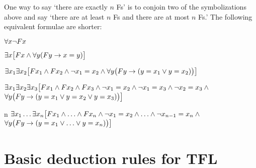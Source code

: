One way to say `there are exactly $n$ Fs' is to conjoin two of the symbolizations above and say `there are at least $n$ Fs and there are at most $n$ Fs.' The following equivalent formulae are shorter:
\begin{ekey}
\item[\text{zero}] $\forall x\neg Fx$
\item[\text{one}] $\exists x\bigl[Fx \wedge \forall y(Fy \rightarrow x= y)\bigr]$
\item[\text{two}] $\exists x_1\exists x_2\bigl[Fx_1 \wedge Fx_2 \wedge \neg x_1 = x_2 \wedge \forall y\bigl(Fy \rightarrow (y= x_1 \vee y = x_2)\bigr) \bigr]$
\item[\text{three}] $\exists x_1\exists x_2\exists x_3\bigl[Fx_1 \wedge Fx_2 \wedge Fx_3 \wedge \neg x_1 =  x_2 \wedge \neg  x_1 = x_3 \wedge \neg x_2 = x_3 \wedge \phantom{.}$\\
\phantom{$\exists x_1 \exists x_2$}$\forall y\bigl(Fy \rightarrow (y = x_1 \vee y = x_2 \vee y =  x_3)\bigr) \bigr]$
\item[n] $\exists x_1\ldots\exists x_n\bigl[Fx_1 \wedge\ldots\wedge Fx_n  \wedge \neg x_1 = x_2 \wedge\ldots\wedge \neg x_{n-1}= x_n \wedge \phantom{.}$\\
\phantom{$\exists x_1\exists x_2$}$\forall y\bigl(Fy \rightarrow (y= x_1 \vee \ldots \vee y= x_n)\bigr)\bigr]$ 
\end{ekey}


\label{ProofRules}
\newpage\section{Basic deduction rules for TFL}\label{glossary:basic rules TFL}
\renewenvironment{proof}
	{\noindent\par\noindent\small$\begin{nd}}
	{\end{nd}$\noindent\normalsize\ignorespacesafterend}
	

